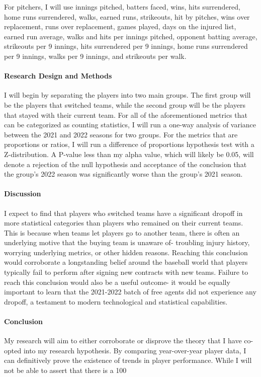 \documentclass[12pt]{article}
\begin{document}
For pitchers, I will use innings pitched, batters faced, wins, hits surrendered, home runs surrendered, walks, earned runs, strikeouts, hit by pitches, wins over replacement, runs over replacement, games played, days on the injured list, earned run average, walks and hits per innings pitched, opponent batting average, strikeouts per 9 innings, hits surrendered per 9 innings, home runs surrendered per 9 innings, walks per 9 innings, and strikeouts per walk.

\paragraph{Research Design and Methods}
I will begin by separating the players into two main groups. The first group will be the players that switched teams, while the second group will be the players that stayed with their current team. For all of the aforementioned metrics that can be categorized as counting statistics, I will run a one-way analysis of variance between the 2021 and 2022 seasons for two groups. For the metrics that are proportions or ratios, I will run a difference of proportions hypothesis test with a Z-distribution. A P-value less than my alpha value, which will likely be 0.05, will denote a rejection of the null hypothesis and acceptance of the conclusion that the group’s 2022 season was significantly worse than the group’s 2021 season.

\paragraph{Discussion}
I expect to find that players who switched teams have a significant dropoff in more statistical categories than players who remained on their current teams. This is because when teams let players go to another team, there is often an underlying motive that the buying team is unaware of- troubling injury history, worrying underlying metrics, or other hidden reasons. Reaching this conclusion would corroborate a longstanding belief around the baseball world that players typically fail to perform after signing new contracts with new teams. Failure to reach this conclusion would also be a useful outcome- it would be equally important to learn that the 2021-2022 batch of free agents did not experience any dropoff, a testament to modern technological and statistical capabilities. 

\paragraph{Conclusion}
My research will aim to either corroborate or disprove the theory that I have co-opted into my research hypothesis. By comparing year-over-year player data, I can definitively prove the existence of trends in player performance. While I will not be able to assert that there is a 100%




\end{document}
